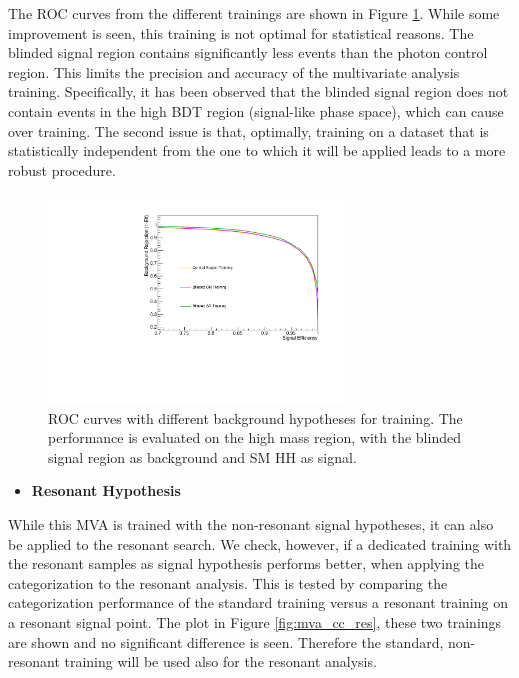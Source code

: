 The ROC curves from the different trainings are shown in Figure \ref{fig:mva_cc_background}. 
While some improvement is seen, this training is not optimal for statistical reasons. 
The blinded signal region contains significantly less events than the photon control region. 
This limits the precision and accuracy of the multivariate analysis training. 
Specifically, it has been observed that the blinded signal region does not contain events in the high BDT region (signal-like phase space), which can cause over training. 
The second issue is that, optimally, training on a dataset that is statistically independent from the one to which it will be applied leads to a more robust procedure. 

\begin{figure}[thb]
  \centering
  \includegraphics[width=0.7\textwidth]{figures/sec-cats/mva/ROC_BCR}\hfil
  \caption{ROC curves with different background hypotheses for training. The performance is evaluated on the high mass region, with the blinded signal region as background and SM HH as signal.}
  \label{fig:mva_cc_background}
\end{figure}

\begin{itemize}
\item \textbf{Resonant Hypothesis}
\end{itemize}

While this MVA is trained with the non-resonant signal hypotheses, it can also be applied to the resonant search. 
We check, however, if a dedicated training with the resonant samples as signal hypothesis performs better, when applying the categorization to the resonant analysis.  
This is tested by comparing the categorization performance of the standard training versus a resonant training on a resonant signal point. 
The plot in Figure \ref{fig:mva_cc_res}, these two trainings are shown and no significant difference is seen. 
Therefore the standard, non-resonant training will be used also for the resonant analysis. 

